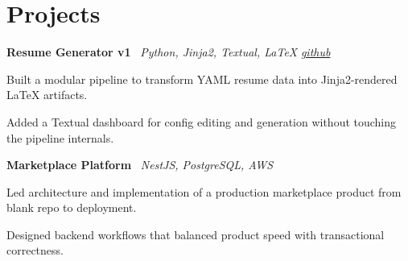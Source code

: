 \section{Projects}

    \hspace{0.5em} \textbf{Resume Generator v1} \textbar \  \textit{Python, Jinja2, Textual, LaTeX}
\hfill \textit{\href{https://github.com/knarfthekant}{github}}
    \vspace{0.10 cm}
    \begin{onecolentry}
        \begin{highlights}
            \item Built a modular pipeline to transform YAML resume data into Jinja2-rendered LaTeX artifacts.
            \item Added a Textual dashboard for config editing and generation without touching the pipeline internals.
        \end{highlights}
    \end{onecolentry}
    \vspace{0.10 cm}

    \hspace{0.5em} \textbf{Marketplace Platform} \textbar \  \textit{NestJS, PostgreSQL, AWS}

    \vspace{0.10 cm}
    \begin{onecolentry}
        \begin{highlights}
            \item Led architecture and implementation of a production marketplace product from blank repo to deployment.
            \item Designed backend workflows that balanced product speed with transactional correctness.
        \end{highlights}
    \end{onecolentry}
    \vspace{0.10 cm}

